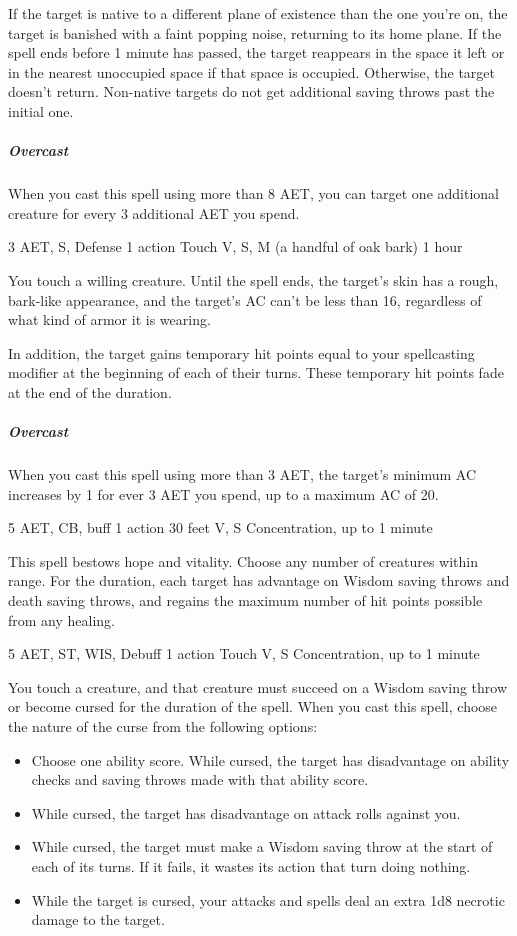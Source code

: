 If the target is native to a different plane of existence than the one you're on, the target is banished with a faint popping noise, returning to its home plane. If the spell ends before 1 minute has passed, the target reappears in the space it left or in the nearest unoccupied space if that space is occupied. Otherwise, the target doesn't return. Non-native targets do not get additional saving throws past the initial one.

\subparagraph*{Overcast} When you cast this spell using more than 8 AET, you can target one additional creature for every 3 additional AET you spend.


{3 AET, S, Defense}
{1 action}
{Touch}
{V, S, M (a handful of oak bark)}
{1 hour}

You touch a willing creature. Until the spell ends, the target's skin has a rough, bark-like appearance, and the target's AC can't be less than 16, regardless of what kind of armor it is wearing.

In addition, the target gains temporary hit points equal to your spellcasting modifier at the beginning of each of their turns. These temporary hit points fade at the end of the duration.

\subparagraph*{Overcast} When you cast this spell using more than 3 AET, the target's minimum AC increases by 1 for ever 3 AET you spend, up to a maximum AC of 20.


{5 AET, CB, buff}
{1 action}
{30 feet}
{V, S}
{Concentration, up to 1 minute}

This spell bestows hope and vitality. Choose any number of creatures within range. For the duration, each target has advantage on Wisdom saving throws and death saving throws, and regains the maximum number of hit points possible from any healing.


{5 AET, ST, WIS, Debuff}
{1 action}
{Touch}
{V, S}
{Concentration, up to 1 minute}

You touch a creature, and that creature must succeed on a Wisdom saving throw or become cursed for the duration of the spell. When you cast this spell, choose the nature of the curse from the following options:

\begin{itemize}
\item Choose one ability score. While cursed, the target has disadvantage on ability checks and saving throws made with that ability score.
\item While cursed, the target has disadvantage on attack rolls against you.
\item While cursed, the target must make a Wisdom saving throw at the start of each of its turns. If it fails, it wastes its action that turn doing nothing.
\item While the target is cursed, your attacks and spells deal an extra 1d8 necrotic damage to the target.
\end{itemize}

